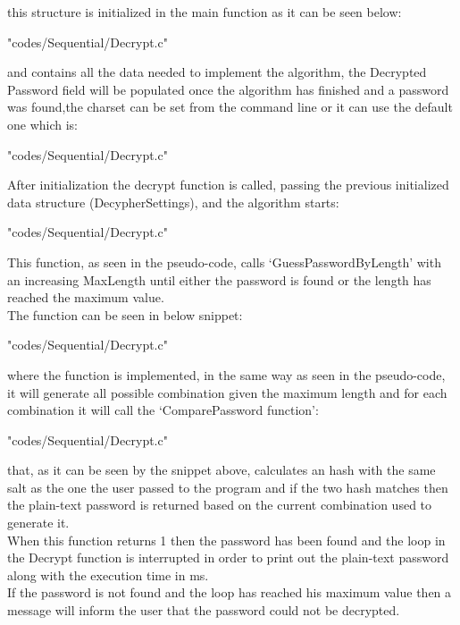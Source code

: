 \documentclass[10pt,twocolumn,letterpaper]{article}
\begin{document}
this structure is initialized in the main function as it can be seen below:
\begin{lstinputlisting}[language=C,style=CSnippetStyle,caption=DecypherSettingsInit Function,firstline=93,lastline=113 ]{
	"codes/Sequential/Decrypt.c"}
\end{lstinputlisting}
and contains all the data needed to implement the algorithm, the Decrypted Password field will be populated once the algorithm has 
finished and a password was found,the charset can be set from the command line or it can use the default one which is:
\begin{lstinputlisting}[language=C,style=CSnippetStyle,caption=Default Charset,firstline=3,lastline=3]{
	"codes/Sequential/Decrypt.c"}
\end{lstinputlisting}
After initialization the decrypt function is called, passing the previous initialized data structure (DecypherSettings), and the 
algorithm starts:
\begin{lstinputlisting}[language=C,style=CSnippetStyle,caption=Decrypt Function,firstline=71,lastline=91]{
	"codes/Sequential/Decrypt.c"}
\end{lstinputlisting}
This function, as seen in the pseudo-code, calls `GuessPasswordByLength' with an increasing MaxLength until either the password is found
or the length has reached the maximum value.\\
The function can be seen in below snippet:\\
\begin{lstinputlisting}[language=C,style=CSnippetStyle,caption=GuessPasswordByLength Function,firstline=27,lastline=69]{
	"codes/Sequential/Decrypt.c"}
\end{lstinputlisting}
where the function is implemented, in the same way as seen in the pseudo-code, it will generate all possible combination given the 
maximum length and for each combination it will call the `ComparePassword function':
\begin{lstinputlisting}[language=C,style=CSnippetStyle,caption=ComparePassword Function,firstline=20,lastline=25]{
	"codes/Sequential/Decrypt.c"}
\end{lstinputlisting}
that, as it can be seen by the snippet above, calculates an hash with the same salt as the one the user passed to the program and if
the two hash matches then the plain-text password is returned based on the current combination used to generate it.\\
When this function returns 1 then the password has been found and the loop in the Decrypt function is interrupted in order to print out 
the plain-text password along with the execution time in ms.\\
If the password is not found and the loop has reached his maximum value then a message will inform the user that the password could not
be decrypted.\\ 
\end{document}
